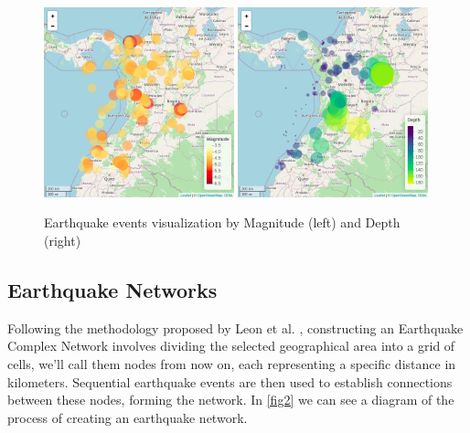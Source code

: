 \documentclass[sn-mathphys-num]{sn-jnl}
\begin{document}
\begin{figure}[H]
    \includegraphics[width=0.49\textwidth]{img/mag.png}
    \includegraphics[width=0.49\textwidth]{img/depth.png}
    \caption{Earthquake events visualization by Magnitude (left) and Depth (right)}\label{fig1}
\end{figure}
\unskip

\subsection{Earthquake Networks}\label{earthquake_networks}
Following the methodology proposed by Leon et al. \cite{leon_modeling_2018}, constructing an Earthquake Complex Network involves dividing the selected geographical area into a grid of cells, we'll call them nodes from now on, each representing a specific distance in kilometers. Sequential earthquake events are then used to establish connections between these nodes, forming the network. In \ref{fig2} we can see a diagram of the process of creating an earthquake network.
\end{document}
